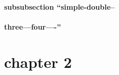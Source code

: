 \documentclass{book}
\begin{document}
\label{anchor:anchor}%

\subsubsection{subsubsection ``simple-double--}
\label{anchor:subsubsection-_0060_0060simple_002ddouble_002d_002d}%

\subsubsection{three---four----''}
\label{anchor:subsubsection-three_002d_002d_002dfour_002d_002d_002d_002d_0027_0027}%

\chapter*{\centering chapter 2}
\label{anchor:chapter2}%

\printindex[cp]
\printindex[fn]
\end{document}
